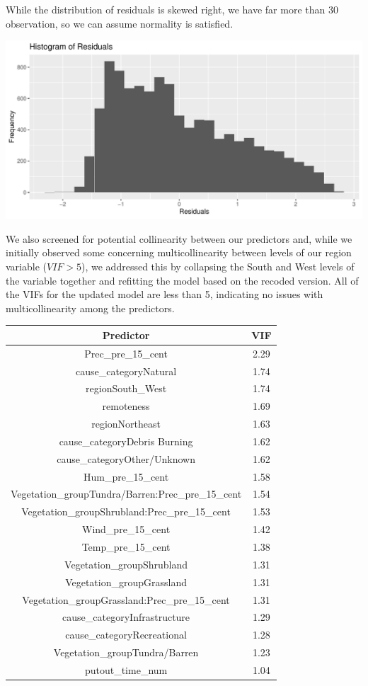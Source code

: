 \documentclass[
  letterpaper,
  DIV=11,
  numbers=noendperiod]{scrartcl}
\begin{document}
While the distribution of residuals is skewed right, we have far more
than 30 observation, so we can assume normality is satisfied.

\includegraphics{written-report_files/figure-pdf/unnamed-chunk-12-1.pdf}

We also screened for potential collinearity between our predictors and,
while we initially observed some concerning multicollinearity between
levels of our region variable (\(VIF > 5\)), we addressed this by
collapsing the South and West levels of the variable together and
refitting the model based on the recoded version. All of the VIFs for
the updated model are less than 5, indicating no issues with
multicollinearity among the predictors.

\begingroup\fontsize{7}{9}\selectfont

\begin{longtable*}[t]{cc}
\toprule
Predictor & VIF\\
\midrule
Prec\_pre\_15\_cent & 2.29\\
cause\_categoryNatural & 1.74\\
regionSouth\_West & 1.74\\
remoteness & 1.69\\
regionNortheast & 1.63\\
\addlinespace
cause\_categoryDebris Burning & 1.62\\
cause\_categoryOther/Unknown & 1.62\\
Hum\_pre\_15\_cent & 1.58\\
Vegetation\_groupTundra/Barren:Prec\_pre\_15\_cent & 1.54\\
Vegetation\_groupShrubland:Prec\_pre\_15\_cent & 1.53\\
\addlinespace
Wind\_pre\_15\_cent & 1.42\\
Temp\_pre\_15\_cent & 1.38\\
Vegetation\_groupShrubland & 1.31\\
Vegetation\_groupGrassland & 1.31\\
Vegetation\_groupGrassland:Prec\_pre\_15\_cent & 1.31\\
\addlinespace
cause\_categoryInfrastructure & 1.29\\
cause\_categoryRecreational & 1.28\\
Vegetation\_groupTundra/Barren & 1.23\\
putout\_time\_num & 1.04\\
\bottomrule
\end{longtable*}
\endgroup{}
\end{document}

